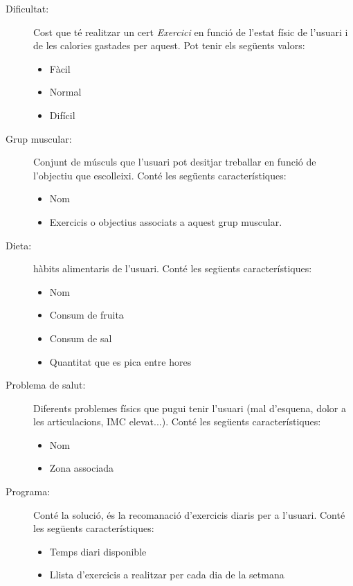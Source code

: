 \documentclass[a4paper, 12pt, UTF8]{article}
\begin{document}
\begin{description}
	\item[Dificultat:] Cost que té realitzar un cert \emph{Exercici} en funció de l'estat físic de l'usuari i de les calories gastades per aquest. Pot tenir els següents valors:
	\begin{itemize}
		\item Fàcil
		\item Normal
		\item Difícil
	\end{itemize}
	
	\item[Grup muscular:] Conjunt de músculs que l'usuari pot desitjar treballar en funció de l'objectiu que escolleixi. Conté les següents característiques:
	\begin{itemize}
		\item Nom
		\item Exercicis o objectius associats a aquest grup muscular.
	\end{itemize}
	
	\item[Dieta:] hàbits alimentaris de l'usuari. Conté les següents característiques:
	\begin{itemize}
		\item Nom
		\item Consum de fruita
		\item Consum de sal
		\item Quantitat que es pica entre hores
	\end{itemize}
	
	\item[Problema de salut:] Diferents problemes físics que pugui tenir l'usuari (mal d'esquena, dolor a les articulacions, IMC elevat...). Conté les següents característiques:
	\begin{itemize}
		\item Nom
		\item Zona associada
	\end{itemize}
	
	\item[Programa:] Conté la solució, és la recomanació d'exercicis diaris per a l'usuari. Conté les següents característiques:
	\begin{itemize}
		\item Temps diari disponible
		\item Llista d'exercicis a realitzar per cada dia de la setmana
	\end{itemize}
\end{description}
\end{document}
